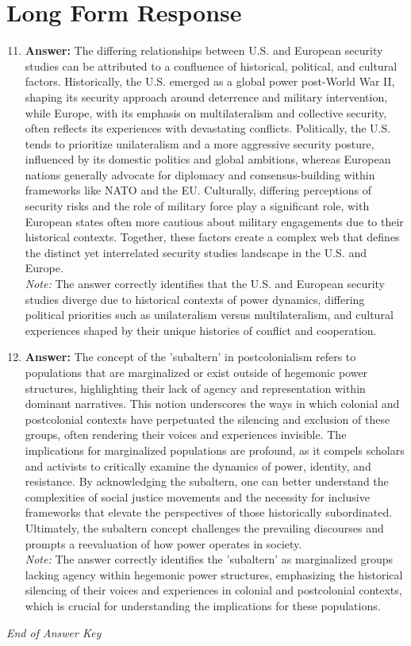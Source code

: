 \documentclass[12pt]{article}
\begin{document}
\section*{Long Form Response}
\begin{enumerate}[label=\arabic*.]
\setcounter{enumi}{10}
\item \textbf{Answer:} The differing relationships between U.S. and European security studies can be attributed to a confluence of historical, political, and cultural factors. Historically, the U.S. emerged as a global power post-World War II, shaping its security approach around deterrence and military intervention, while Europe, with its emphasis on multilateralism and collective security, often reflects its experiences with devastating conflicts. Politically, the U.S. tends to prioritize unilateralism and a more aggressive security posture, influenced by its domestic politics and global ambitions, whereas European nations generally advocate for diplomacy and consensus-building within frameworks like NATO and the EU. Culturally, differing perceptions of security risks and the role of military force play a significant role, with European states often more cautious about military engagements due to their historical contexts. Together, these factors create a complex web that defines the distinct yet interrelated security studies landscape in the U.S. and Europe.
\\ \textit{Note:} The answer correctly identifies that the U.S. and European security studies diverge due to historical contexts of power dynamics, differing political priorities such as unilateralism versus multilateralism, and cultural experiences shaped by their unique histories of conflict and cooperation.
\item \textbf{Answer:} The concept of the 'subaltern' in postcolonialism refers to populations that are marginalized or exist outside of hegemonic power structures, highlighting their lack of agency and representation within dominant narratives. This notion underscores the ways in which colonial and postcolonial contexts have perpetuated the silencing and exclusion of these groups, often rendering their voices and experiences invisible. The implications for marginalized populations are profound, as it compels scholars and activists to critically examine the dynamics of power, identity, and resistance. By acknowledging the subaltern, one can better understand the complexities of social justice movements and the necessity for inclusive frameworks that elevate the perspectives of those historically subordinated. Ultimately, the subaltern concept challenges the prevailing discourses and prompts a reevaluation of how power operates in society.
\\ \textit{Note:} The answer correctly identifies the 'subaltern' as marginalized groups lacking agency within hegemonic power structures, emphasizing the historical silencing of their voices and experiences in colonial and postcolonial contexts, which is crucial for understanding the implications for these populations.
\end{enumerate}

\vfill
\noindent\textit{End of Answer Key}
\end{document}

